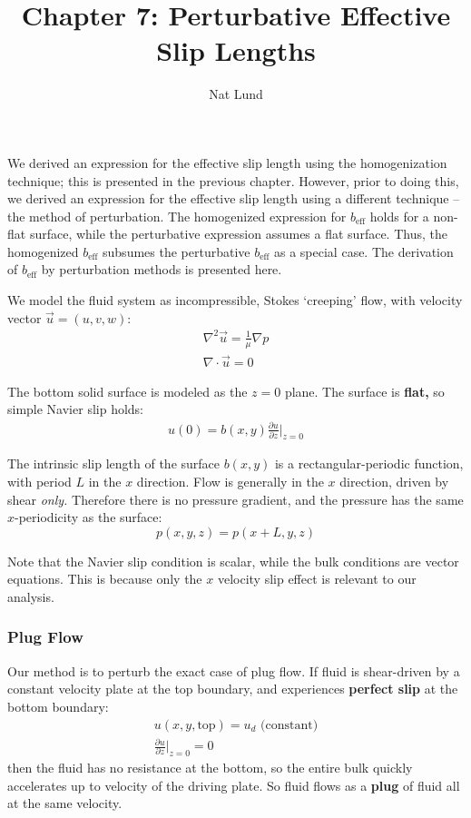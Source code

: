 \documentclass[a4paper]{report}
\title{Chapter 7: Perturbative Effective Slip Lengths}
\author{Nat Lund}
\newcommand{\beff}{\ensuremath{b_{\mathrm{eff}}}}
\begin{document}
\maketitle

We derived an expression for the effective slip length using the homogenization technique; this is presented in the previous chapter.  However, prior to doing this, we derived an expression for the effective slip length using a different technique -- the method of perturbation.  The homogenized expression for $\beff$ holds for a non-flat surface, while the perturbative expression assumes a flat surface.  Thus, the homogenized $\beff$ subsumes the perturbative $\beff$ as a special case.  The derivation of $\beff$ by perturbation methods is presented here.

\vspace{1em}

We model the fluid system as incompressible, Stokes `creeping' flow, with velocity vector $\vec{u} = (u,v,w)$: 
\begin{gather}
\nabla^2 \vec{u} = \frac{1}{\mu} \nabla p  \\
\nabla \cdot \vec{u} = 0
\end{gather}

The bottom solid surface is modeled as the $z=0$ plane.  
The surface is \textbf{flat,} so simple Navier slip holds:
\begin{gather}
u(0) = b(x,y) \frac{\partial u}{\partial z} \rvert_{z=0}
\end{gather}

The intrinsic slip length of the surface $b(x,y)$ is a rectangular-periodic function, with period $L$ in the $x$ direction.
Flow is generally in the $x$ direction, driven by shear \emph{only.}  Therefore there is no pressure gradient, and the pressure has the same $x$-periodicity as the surface:
\begin{equation}
p(x,y,z) = p(x+L,y,z)
\end{equation}


Note that the Navier slip condition is scalar, while the bulk conditions are vector equations.  This is because only the $x$ velocity slip effect is relevant to our analysis.



\subsubsection*{Plug Flow}

Our method is to perturb the exact case of plug flow.  If fluid is shear-driven by a constant velocity plate at the top boundary, and experiences \textbf{perfect slip} at the bottom boundary:
\begin{gather}
u(x,y,\mathrm{top}) = u_d \text{  (constant)} \\
\frac{\partial u}{\partial z} \rvert_{z=0} = 0
\end{gather}
then the fluid has no resistance at the bottom, so the entire bulk quickly accelerates up to velocity of the driving plate.  So fluid flows as a \textbf{plug} of fluid all at the same velocity.
\end{document}
